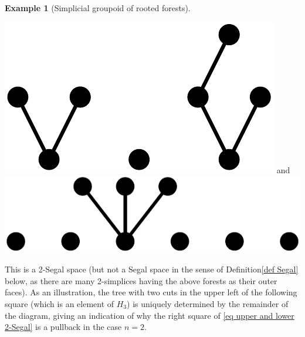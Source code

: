 \documentclass{conm-p-l}
\theoremstyle{definition}
\newtheorem{example}[theorem]{Example}
\theoremstyle{remark}
\begin{document}
\begin{example}[Simplicial groupoid of rooted forests]
\begin{center}
\includegraphics[scale=0.2]{forest_cut_0.pdf} \qquad and \qquad \includegraphics[scale=0.2]{forest_cut_2.pdf} 
\end{center}
This is a 2-Segal space (but not a Segal space in the sense of Definition\nobreakspace \ref {def Segal} below, as there are many 2-simplices having the above forests as their outer faces).
As an illustration, the tree with two cuts in the upper left of the following square (which is an element of $H_3$) is uniquely determined by the remainder of the diagram, giving an indication of why the right square of \eqref{eq upper and lower 2-Segal} is a pullback in the case $n=2$.
\begin{center}
\end{center}
\end{example}
\end{document}
